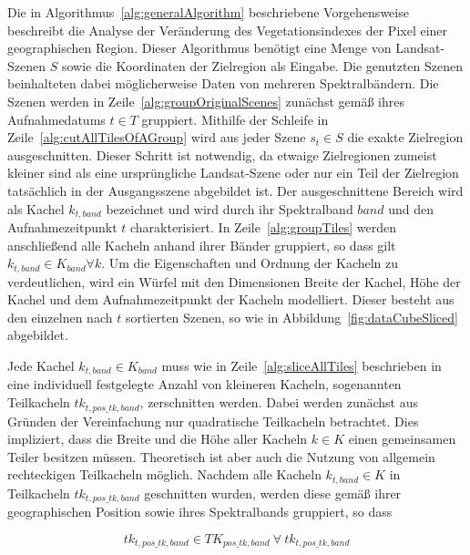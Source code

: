 Die in Algorithmus~\ref{alg:generalAlgorithm} beschriebene Vorgehensweise beschreibt die Analyse der Veränderung des Vegetationsindexes der Pixel einer geographischen Region. Dieser Algorithmus benötigt eine Menge von Landsat-Szenen $S$ sowie die Koordinaten der Zielregion als Eingabe. Die genutzten Szenen beinhalteten dabei möglicherweise Daten von mehreren Spektralbändern. Die Szenen werden in Zeile~\ref{alg:groupOriginalScenes} zunächst gemäß ihres Aufnahmedatums $t \in T$ gruppiert. Mithilfe der Schleife in Zeile~\ref{alg:cutAllTilesOfAGroup} wird aus jeder Szene $s_t \in S$ die exakte Zielregion ausgeschnitten. Dieser Schritt ist notwendig, da etwaige Zielregionen zumeist kleiner sind als eine ursprüngliche Landsat-Szene oder nur ein Teil der Zielregion tatsächlich in der Ausgangsszene abgebildet ist. Der ausgeschnittene Bereich wird als Kachel $k_{t, band}$ bezeichnet und wird durch ihr Spektralband $band$ und den Aufnahmezeitpunkt $t$ charakterisiert. In Zeile~\ref{alg:groupTiles} werden anschließend alle Kacheln anhand ihrer Bänder gruppiert, so dass gilt $k_{t, band} \in K_{band} \forall k$. Um die Eigenschaften und Ordnung der Kacheln zu verdeutlichen, wird ein Würfel mit den Dimensionen Breite der Kachel, Höhe der Kachel und dem Aufnahmezeitpunkt der Kacheln modelliert. Dieser besteht aus den einzelnen nach $t$ sortierten Szenen, so wie in Abbildung~\ref{fig:dataCubeSliced} abgebildet. 

Jede Kachel $k_{t, band} \in K_{band}$ muss wie in Zeile~\ref{alg:sliceAllTiles} beschrieben in eine individuell festgelegte Anzahl von kleineren Kacheln, sogenannten Teilkacheln $tk_{t, pos\_tk, band}$, zerschnitten werden. Dabei werden zunächst aus Gründen der Vereinfachung nur quadratische Teilkacheln betrachtet. Dies impliziert, dass die Breite und die Höhe aller Kacheln $k \in K$ einen gemeinsamen Teiler besitzen müssen. Theoretisch ist aber auch die Nutzung von allgemein rechteckigen Teilkacheln möglich. Nachdem alle Kacheln $k_{t, band} \in K$ in Teilkacheln $tk_{t, pos\_tk, band}$ geschnitten wurden, werden diese gemäß ihrer geographischen Position sowie ihres Spektralbands gruppiert, so dass 

\begin{equation} \label{eq:numberOfSubsceneGroups}
tk_{t, pos\_tk, band} \in TK_{pos\_tk, band}\ \forall\ tk_{t, pos\_tk, band}
\end{equation}

